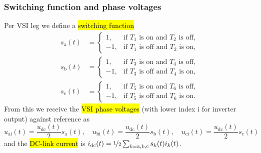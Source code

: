 \begin{frame}
    \frametitle{Switching function and phase voltages}
    Per VSI leg we define a \hl{switching function}
    \begin{equation}
        \begin{split}
            s_\mathrm{a}(t) & = \begin{cases}
                                    1,  & \text{if } T_1 \text{ is on and } T_2 \text{ is off}, \\
                                    -1, & \text{if } T_1 \text{ is off and } T_2 \text{ is on},
                                \end{cases} \\
            s_\mathrm{b}(t) & = \begin{cases}
                                    1,  & \text{if } T_3 \text{ is on and } T_4 \text{ is off}, \\
                                    -1, & \text{if } T_3 \text{ is off and } T_4 \text{ is on},
                                \end{cases} \\
            s_\mathrm{c}(t) & = \begin{cases}
                                    1,  & \text{if } T_5 \text{ is on and } T_6 \text{ is off}, \\
                                    -1, & \text{if } T_5 \text{ is off and } T_6 \text{ is on}.
                                \end{cases}
        \end{split}
        \label{eq:2L_VSI_switching_functions}
    \end{equation}\pause
    From this we receive the \hl{VSI phase voltages} (with lower index $\mathrm{i}$ for inverter output) against reference as
    \begin{equation}
        u_\mathrm{ai}(t) = \frac{u_\mathrm{dc}(t)}{2} s_\mathrm{a}(t), \quad
        u_\mathrm{bi}(t) = \frac{u_\mathrm{dc}(t)}{2} s_\mathrm{b}(t), \quad
        u_\mathrm{ci}(t) = \frac{u_\mathrm{dc}(t)}{2} s_\mathrm{c}(t)
        \label{eq:VSI_phase_voltages}
    \end{equation}
    and the \hl{DC-link current} is $i_\mathrm{dc}(t) = \nicefrac{1}{2}\sum_{k=\mathrm{a, b, c}}s_k(t)i_k(t)$.
\end{frame}

